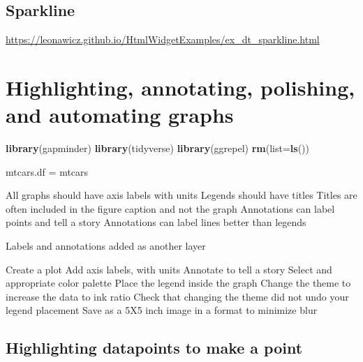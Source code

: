 \documentclass[]{krantz}
\makeatletter
\newenvironment{Shaded}{\begin{snugshade}}{\end{snugshade}}
\newcommand{\DataTypeTok}[1]{\textcolor[rgb]{0.13,0.29,0.53}{#1}}
\newcommand{\KeywordTok}[1]{\textcolor[rgb]{0.13,0.29,0.53}{\textbf{#1}}}
\newcommand{\NormalTok}[1]{#1}
\newcommand{\StringTok}[1]{\textcolor[rgb]{0.31,0.60,0.02}{#1}}
\newenvironment{kframe}{%
\medskip{}
\setlength{\fboxsep}{.8em}
 \def\at@end@of@kframe{}%
 \ifinner\ifhmode%
  \def\at@end@of@kframe{\end{minipage}}%
  \begin{minipage}{\columnwidth}%
 \fi\fi%
 \def\FrameCommand##1{\hskip\@totalleftmargin \hskip-\fboxsep
 \colorbox{shadecolor}{##1}\hskip-\fboxsep
     \hskip-\linewidth \hskip-\@totalleftmargin \hskip\columnwidth}%
 \MakeFramed {\advance\hsize-\width
   \@totalleftmargin\z@ \linewidth\hsize
   \@setminipage}}%
 {\par\unskip\endMakeFramed%
 \at@end@of@kframe}
\renewenvironment{Shaded}{\begin{kframe}}{\end{kframe}}
\makeatother
\begin{document}
\hypertarget{htmlwidget-332b566bb7967e8a7951}{}

\hypertarget{sparkline}{%
\section{Sparkline}\label{sparkline}}

\url{https://leonawicz.github.io/HtmlWidgetExamples/ex_dt_sparkline.html}

\cleardoublepage

\hypertarget{Polishing}{%
\chapter{Highlighting, annotating, polishing, and automating graphs}\label{Polishing}}

\begin{Shaded}
\begin{Highlighting}[]
\KeywordTok{library}\NormalTok{(gapminder)}
\KeywordTok{library}\NormalTok{(tidyverse)}
\KeywordTok{library}\NormalTok{(ggrepel)}
\KeywordTok{rm}\NormalTok{(}\DataTypeTok{list=}\KeywordTok{ls}\NormalTok{())}

\NormalTok{mtcars.df =}\StringTok{ }\NormalTok{mtcars}
\end{Highlighting}
\end{Shaded}

All graphs should have axis labels with units
Legends should have titles
Titles are often included in the figure caption and not the graph
Annotations can label points and tell a story
Annotations can label lines better than legends

Labels and annotations added as another layer

Create a plot
Add axis labels, with units
Annotate to tell a story
Select and appropriate color palette
Place the legend inside the graph
Change the theme to increase the data to ink ratio
Check that changing the theme did not undo your legend placement
Save as a 5X5 inch image in a format to minimize blur

\hypertarget{highlighting-datapoints-to-make-a-point}{%
\section{Highlighting datapoints to make a point}\label{highlighting-datapoints-to-make-a-point}}
\end{document}
